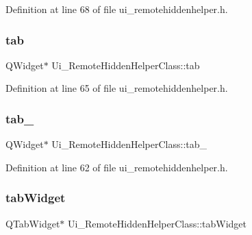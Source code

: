 Definition at line 68 of file ui\+\_\+remotehiddenhelper.\+h.

\hypertarget{class_ui___remote_hidden_helper_class_ae37c455b5bea2ecfd49d5f4bcc42f817}{}\label{class_ui___remote_hidden_helper_class_ae37c455b5bea2ecfd49d5f4bcc42f817} 
\subsubsection{\texorpdfstring{tab}{tab}}
{\footnotesize\ttfamily Q\+Widget$\ast$ Ui\+\_\+\+Remote\+Hidden\+Helper\+Class\+::tab}



Definition at line 65 of file ui\+\_\+remotehiddenhelper.\+h.

\hypertarget{class_ui___remote_hidden_helper_class_ac10b9b3c90ebc8ee171f32ac9b9af200}{}\label{class_ui___remote_hidden_helper_class_ac10b9b3c90ebc8ee171f32ac9b9af200} 
\subsubsection{\texorpdfstring{tab\+\_}{tab\_2}}
{\footnotesize\ttfamily Q\+Widget$\ast$ Ui\+\_\+\+Remote\+Hidden\+Helper\+Class\+::tab\+\_}



Definition at line 62 of file ui\+\_\+remotehiddenhelper.\+h.

\hypertarget{class_ui___remote_hidden_helper_class_acf56d127ecf6c695cdbdbd5f278c1364}{}\label{class_ui___remote_hidden_helper_class_acf56d127ecf6c695cdbdbd5f278c1364} 
\subsubsection{\texorpdfstring{tab\+Widget}{tabWidget}}
{\footnotesize\ttfamily Q\+Tab\+Widget$\ast$ Ui\+\_\+\+Remote\+Hidden\+Helper\+Class\+::tab\+Widget}



